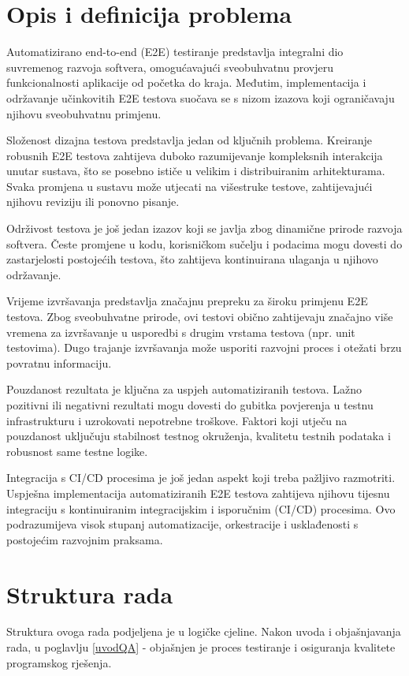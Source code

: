 \section*{Opis i definicija problema}
Automatizirano end-to-end (E2E) testiranje predstavlja integralni dio suvremenog razvoja softvera, omogućavajući sveobuhvatnu provjeru funkcionalnosti aplikacije od početka do kraja.
Međutim, implementacija i održavanje učinkovitih E2E testova suočava se s nizom izazova koji ograničavaju njihovu sveobuhvatnu primjenu.

Složenost dizajna testova predstavlja jedan od ključnih problema.
Kreiranje robusnih E2E testova zahtijeva duboko razumijevanje kompleksnih interakcija unutar sustava, što se posebno ističe u velikim i distribuiranim arhitekturama.
Svaka promjena u sustavu može utjecati na višestruke testove, zahtijevajući njihovu reviziju ili ponovno pisanje.

Održivost testova je još jedan izazov koji se javlja zbog dinamične prirode razvoja softvera.
Česte promjene u kodu, korisničkom sučelju i podacima mogu dovesti do zastarjelosti postojećih testova, što zahtijeva kontinuirana ulaganja u njihovo održavanje.

Vrijeme izvršavanja predstavlja značajnu prepreku za široku primjenu E2E testova.
Zbog sveobuhvatne prirode, ovi testovi obično zahtijevaju značajno više vremena za izvršavanje u usporedbi s drugim vrstama testova (npr. unit testovima).
Dugo trajanje izvršavanja može usporiti razvojni proces i otežati brzu povratnu informaciju.

Pouzdanost rezultata je ključna za uspjeh automatiziranih testova.
Lažno pozitivni ili negativni rezultati mogu dovesti do gubitka povjerenja u testnu infrastrukturu i uzrokovati nepotrebne troškove.
Faktori koji utječu na pouzdanost uključuju stabilnost testnog okruženja, kvalitetu testnih podataka i robusnost same testne logike.

Integracija s CI/CD procesima je još jedan aspekt koji treba pažljivo razmotriti.
Uspješna implementacija automatiziranih E2E testova zahtijeva njihovu tijesnu integraciju s kontinuiranim integracijskim i isporučnim (CI/CD) procesima.
Ovo podrazumijeva visok stupanj automatizacije, orkestracije i usklađenosti s postojećim razvojnim praksama.

\section*{Struktura rada}
Struktura ovoga rada podjeljena je u logičke cjeline.
Nakon uvoda i objašnjavanja rada, u poglavlju \ref{uvodQA} -  objašnjen je proces testiranje i osiguranja kvalitete programskog rješenja.


